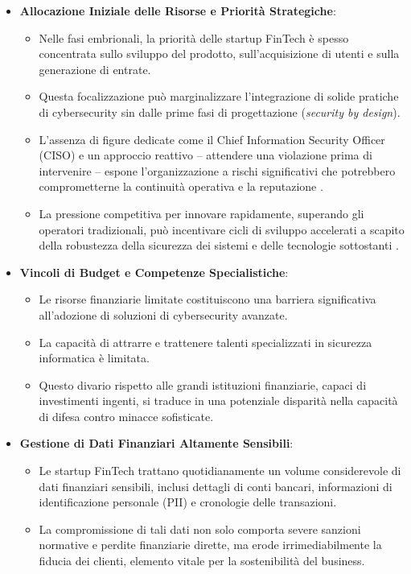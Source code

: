 \begin{itemize}
    \item \textbf{Allocazione Iniziale delle Risorse e Priorità Strategiche}: 
    \begin{itemize}
        \item Nelle fasi embrionali, la priorità delle startup FinTech è spesso concentrata sullo sviluppo del prodotto, sull'acquisizione di utenti e sulla generazione di entrate.
        \item Questa focalizzazione può marginalizzare l'integrazione di solide pratiche di cybersecurity sin dalle prime fasi di progettazione (\emph{security by design}).
        \item L'assenza di figure dedicate come il Chief Information Security Officer (CISO) e un approccio reattivo – attendere una violazione prima di intervenire – espone l'organizzazione a rischi significativi che potrebbero comprometterne la continuità operativa e la reputazione \cite{Kaur2021}.
        \item La pressione competitiva per innovare rapidamente, superando gli operatori tradizionali, può incentivare cicli di sviluppo accelerati a scapito della robustezza della sicurezza dei sistemi e delle tecnologie sottostanti \cite{teppoKauppinenRiskAndSecurityManagementInSaaSStartup_2024}.
    \end{itemize}
    
    \item \textbf{Vincoli di Budget e Competenze Specialistiche}:
    \begin{itemize}
        \item Le risorse finanziarie limitate costituiscono una barriera significativa all'adozione di soluzioni di cybersecurity avanzate.
        \item La capacità di attrarre e trattenere talenti specializzati in sicurezza informatica è limitata.
        \item Questo divario rispetto alle grandi istituzioni finanziarie, capaci di investimenti ingenti, si traduce in una potenziale disparità nella capacità di difesa contro minacce sofisticate.
    \end{itemize}
    
    \item \textbf{Gestione di Dati Finanziari Altamente Sensibili}:
    \begin{itemize}
        \item Le startup FinTech trattano quotidianamente un volume considerevole di dati finanziari sensibili, inclusi dettagli di conti bancari, informazioni di identificazione personale (PII) e cronologie delle transazioni.
        \item La compromissione di tali dati non solo comporta severe sanzioni normative e perdite finanziarie dirette, ma erode irrimediabilmente la fiducia dei clienti, elemento vitale per la sostenibilità del business.
    \end{itemize}
    

\end{itemize}

